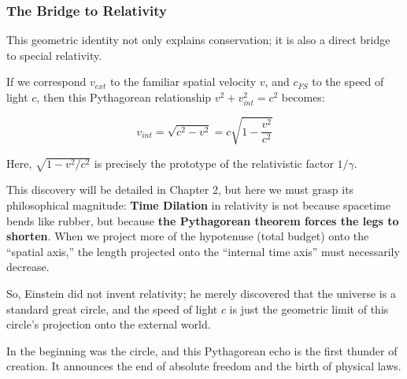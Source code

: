 \subsubsection{The Bridge to Relativity}

This geometric identity not only explains conservation; it is also a direct bridge to special relativity.

If we correspond $v_{ext}$ to the familiar spatial velocity $v$, and $c_{FS}$ to the speed of light $c$, then this Pythagorean relationship $v^2 + v_{int}^2 = c^2$ becomes:

\[v_{int} = \sqrt{c^2 - v^2} = c \sqrt{1 - \frac{v^2}{c^2}}\]

Here, $\sqrt{1 - v^2/c^2}$ is precisely the prototype of the relativistic factor $1/\gamma$.

This discovery will be detailed in Chapter 2, but here we must grasp its philosophical magnitude: \textbf{Time Dilation} in relativity is not because spacetime bends like rubber, but because \textbf{the Pythagorean theorem forces the legs to shorten}. When we project more of the hypotenuse (total budget) onto the ``spatial axis,'' the length projected onto the ``internal time axis'' must necessarily decrease.

So, Einstein did not invent relativity; he merely discovered that the universe is a standard great circle, and the speed of light $c$ is just the geometric limit of this circle's projection onto the external world.

In the beginning was the circle, and this Pythagorean echo is the first thunder of creation. It announces the end of absolute freedom and the birth of physical laws.


